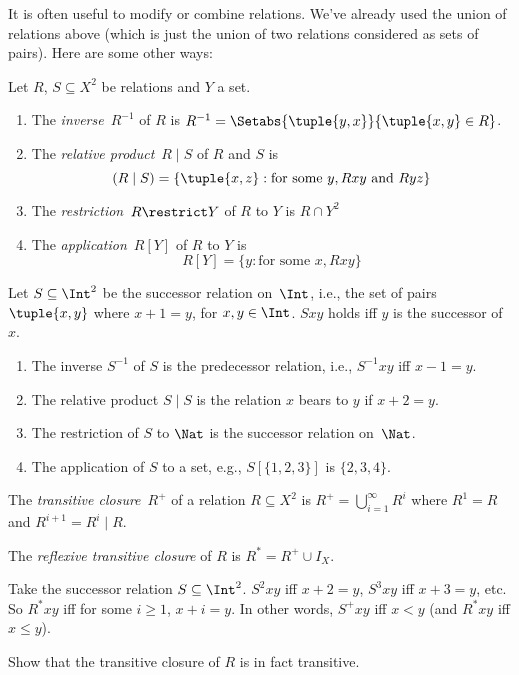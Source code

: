 \documentclass[../../include/open-logic-section]{subfiles}
\begin{document}

It is often useful to modify or combine relations. We've already used
the union of relations above (which is just the union of two relations
considered as sets of pairs). Here are some other ways:

\begin{defn} Let $R$, $S \subseteq X^2$ be relations and $Y$ a set.
\begin{enumerate}
\item The \emph{inverse}~$R^{-1}$ of $R$ is $R^{-1} = \Setabs{\tuple{y,
    x}}{\tuple{x, y} \in R}$.
\item The \emph{relative product}~$R \mid S$ of $R$ and $S$ is 
\[
(R \mid S) = \{\tuple{x, z} : \text{for some } y, Rxy \text{ and } Ryz\}
\]
\item The \emph{restriction}~$R \restrict Y$ of $R$ to $Y$ is $R \cap Y^2$
\item The \emph{application}~$R[Y]$ of $R$ to $Y$ is
\[
R[Y] = \{y : \text{for some } x, Rxy\}
\]
\end{enumerate}
\end{defn}

\begin{ex}
Let $S \subseteq \Int^2$ be the successor relation on~$\Int$, i.e.,
the set of pairs $\tuple{x, y}$ where $x + 1 = y$, for $x, y \in
\Int$. $Sxy$ holds iff $y$ is the successor of~$x$.
\begin{enumerate}
\item The inverse $S^{-1}$ of $S$ is the predecessor relation, i.e.,
  $S^{-1}xy$ iff $x-1 = y$.
\item The relative product $S\mid S$ is the relation $x$ bears to $y$
  if $x+2 = y$.
\item The restriction of $S$ to $\Nat$ is the successor relation
  on~$\Nat$.
\item The application of $S$ to a set, e.g., $S[\{1, 2, 3\}]$ is $\{2,
  3, 4\}$.
\end{enumerate}

\end{ex}

\begin{defn}
The \emph{transitive closure}~$R^+$ of a relation $R \subseteq X^2$ is
$R^+ = \bigcup_{i=1}^\infty R^i$ where $R^1 = R$ and $R^{i+1} = R^i
\mid R$.

The \emph{reflexive transitive closure} of $R$ is $R^* = R^+ \cup
I_X$.
\end{defn}

\begin{ex}
Take the successor relation $S \subseteq \Int^2$. $S^2xy$ iff $x + 2 =
y$, $S^3xy$ iff $x + 3 = y$, etc. So $R^*xy$ iff for some $i \ge 1$,
$x + i = y$.  In other words, $S^+xy$ iff $x < y$ (and $R^*xy$ iff $x
\le y$).
\end{ex}

\begin{prob}
Show that the transitive closure of $R$ is in fact transitive.
\end{prob}
\end{document}
